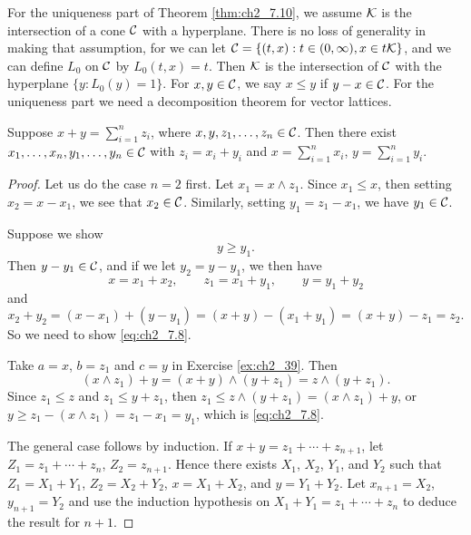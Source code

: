 
For the uniqueness part of Theorem \ref{thm:ch2_7.10}, we assume $\mathcal{K}$ is the intersection of a cone $\mathcal{C}$ with a hyperplane. There is no loss of generality in making that assumption, for we can let $\mathcal{C} = \{(t,x) : t \in (0, \infty), x \in t\mathcal{K}\}$, and we can define $L_0$ on $\mathcal{C}$ by $L_0(t,x) = t$. Then $\mathcal{K}$ is the intersection of $\mathcal{C}$ with the hyperplane $\{y : L_0(y) = 1\}$. For $x, y \in \mathcal{C}$, we say $x\leq y$ if $y - x \in \mathcal{C}$. For the uniqueness part we need a decomposition theorem for vector lattices.


\begin{theorem}\label{thm:ch2_7.17}
Suppose $x + y = \sum_{i=1}^n z_i$, where $x,y,z_1,\ldots,z_n \in \mathcal{C}$. Then there exist $x_1,\ldots,x_n, y_1,\ldots,y_n \in \mathcal{C}$ with $z_i = x_i + y_i$ and $x = \sum_{i=1}^n x_i$, $y = \sum_{i=1}^n y_i$.
\end{theorem}

\begin{proof}
Let us do the case $n = 2$ first. Let $x_1 = x \wedge z_1$. Since $x_1 \leq x$, then setting $x_2 = x - x_1$, we see that $x_2 \in \mathcal{C}$. Similarly, setting $y_1 = z_1 - x_1$, we have $y_1 \in \mathcal{C}$.

Suppose we show
\begin{equation}\label{eq:ch2_7.8}
    y \geq y_1.
\end{equation}
Then $y - y_1 \in \mathcal{C}$, and if we let $y_2 = y - y_1$, we then have
\[
    x = x_1 + x_2, \qquad z_1 = x_1 + y_1, \qquad y = y_1 + y_2
\]
and
\[
    x_2 + y_2 = (x - x_1) + (y - y_1) = (x + y) - (x_1 + y_1) = (x + y) - z_1 = z_2.
\]
So we need to show \eqref{eq:ch2_7.8}.

Take $a = x$, $b = z_1$ and $c = y$ in Exercise \ref{ex:ch2_39}. Then
\mpagebreak
\[
    (x \wedge z_1) + y = (x + y) \wedge (y + z_1) = z \wedge (y + z_1).
\]
Since $z_1 \leq z$ and $z_1 \leq y + z_1$, then $z_1 \leq z \wedge (y + z_1) = (x \wedge z_1) + y$, or $y \geq z_1 - (x \wedge z_1) = z_1 - x_1 = y_1$, which is \eqref{eq:ch2_7.8}.

The general case follows by induction. If $x + y = z_1 + \cdots + z_{n+1}$, let $Z_1 = z_1 + \cdots + z_n$, $Z_2 = z_{n+1}$. Hence there exists $X_1$, $X_2$, $Y_1$, and $Y_2$ such that $Z_1 = X_1 + Y_1$, $Z_2 = X_2 + Y_2$, $x = X_1 + X_2$, and $y = Y_1 + Y_2$. Let $x_{n+1} = X_2$, $y_{n+1} = Y_2$ and use the induction hypothesis on $X_1 + Y_1 = z_1 + \cdots + z_n$ to deduce the result for $n + 1$.
\end{proof}

